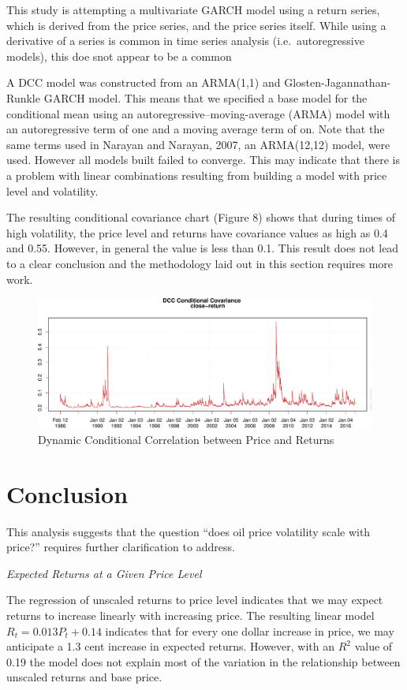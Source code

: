 \documentclass[]{article}
\begin{document}
This study is attempting a multivariate GARCH model using a return
series, which is derived from the price series, and the price series
itself. While using a derivative of a series is common in time series
analysis (i.e.~autoregressive models), this doe snot appear to be a
common

A DCC model was constructed from an ARMA(1,1) and
Glosten-Jagannathan-Runkle GARCH model. This means that we specified a
base model for the conditional mean using an
autoregressive--moving-average (ARMA) model with an autoregressive term
of one and a moving average term of on. Note that the same terms used in
Narayan and Narayan, 2007, an ARMA(12,12) model, were used. However all
models built failed to converge. This may indicate that there is a
problem with linear combinations resulting from building a model with
price level and volatility.

The resulting conditional covariance chart (Figure 8) shows that during
times of high volatility, the price level and returns have covariance
values as high as 0.4 and 0.55. However, in general the value is less
than 0.1. This result does not lead to a clear conclusion and the
methodology laid out in this section requires more work.

\begin{figure}[htbp]
\centering
\includegraphics{Figs/unnamed-chunk-19-1.pdf}
\caption{Dynamic Conditional Correlation between Price and Returns}
\end{figure}

\section{Conclusion}\label{conclusion}

This analysis suggests that the question ``does oil price volatility
scale with price?'' requires further clarification to address.

\emph{Expected Returns at a Given Price Level}

The regression of unscaled returns to price level indicates that we may
expect returns to increase linearly with increasing price. The resulting
linear model \(R_t = 0.013P_t+0.14\) indicates that for every one dollar
increase in price, we may anticipate a 1.3 cent increase in expected
returns. However, with an \(R^2\) value of 0.19 the model does not
explain most of the variation in the relationship between unscaled
returns and base price.
\end{document}
